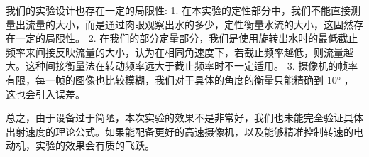 \documentclass[fontset=windows]{article}
\begin{document}
我们的实验设计也存在一定的局限性:  1. 在本实验的定性部分中，我们不能直接测量出流量的大小，而是通过肉眼观察出水的多少，定性衡量水流的大小，这固然存在一定的局限性。 2. 在我们的部分定量部分，我们是使用旋转出水时的最低截止频率来间接反映流量的大小，认为在相同角速度下，若截止频率越低，则流量越大。这种间接衡量法在转动频率远大于截止频率时不一定适用。 3. 摄像机的帧率有限，每一帧的图像也比较模糊，我们对于具体的角度的衡量只能精确到 $10°$ ，这也会引入误差。

总之，由于设备过于简陋，本次实验的效果不是非常好，我们也未能完全验证具体出射速度的理论公式。如果能配备更好的高速摄像机，以及能够精准控制转速的电动机，实验的效果会有质的飞跃。
\end{document}
